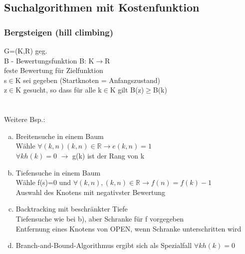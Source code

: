 \documentclass[a4paper,14pt]{article}
\begin{document}
\subsection{Suchalgorithmen mit Kostenfunktion}
\subsubsection{Bergsteigen (hill climbing)}
G=(K,R) geg.\\
B - Bewertungsfunktion B: K$\rightarrow$R\\
feste Bewertung für Zielfunktion\\
s$\in$K sei gegeben (Startknoten = Anfangszustand)\\
z$\in$K gesucht, so dass für alle k$\in$K gilt B(z)$\geq$B(k)\\
\\
\\




Weitere Bsp.:
\begin{enumerate}[(a)]
 \item Breitensuche in einem Baum\\
	Wähle $\forall(k,n) (k,n)\in\mathbb{R}\rightarrow e(k,n)=1$\\
	$\forall k h(k)=0 $
	$\rightarrow$ g(k) ist der Rang von k
 \item Tiefensuche in einem Baum\\
	Wähle f(s)=0 und $\forall(k,n), (k,n)\in\mathbb{R}\rightarrow f(n)=f(k)-1$\\
	Auswahl des Knotens mit negativster Bewertung
 \item Backtracking mit beschränkter Tiefe\\
       Tiefensuche wie bei b), aber Schranke für f vorgegeben\\
       Entfernung eines Knotens von OPEN, wenn Schranke unterschritten wird
  \item Branch-and-Bound-Algorithmus ergibt sich als Spezialfall $\forall k h(k)=0$
\end{enumerate}
\end{document}
